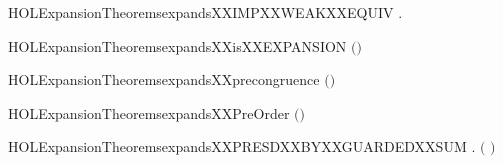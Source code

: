 \newcommand{\HOLExpansionTheoremsexpandsXXEPSYY}{\UseVerbatim{HOLExpansionTheoremsexpandsXXEPSYY}}
\begin{SaveVerbatim}{HOLExpansionTheoremsexpandsXXIMPXXWEAKXXEQUIV}
\HOLTokenTurnstile{} \HOLSymConst{\HOLTokenForall{}} .    \HOLSymConst{\HOLTokenImp{}}   
\end{SaveVerbatim}
\newcommand{\HOLExpansionTheoremsexpandsXXIMPXXWEAKXXEQUIV}{\UseVerbatim{HOLExpansionTheoremsexpandsXXIMPXXWEAKXXEQUIV}}
\begin{SaveVerbatim}{HOLExpansionTheoremsexpandsXXisXXEXPANSION}
\HOLTokenTurnstile{}  \ensuremath{(}\ensuremath{)}
\end{SaveVerbatim}
\newcommand{\HOLExpansionTheoremsexpandsXXisXXEXPANSION}{\UseVerbatim{HOLExpansionTheoremsexpandsXXisXXEXPANSION}}
\begin{SaveVerbatim}{HOLExpansionTheoremsexpandsXXprecongruence}
\HOLTokenTurnstile{}  \ensuremath{(}\ensuremath{)}
\end{SaveVerbatim}
\newcommand{\HOLExpansionTheoremsexpandsXXprecongruence}{\UseVerbatim{HOLExpansionTheoremsexpandsXXprecongruence}}
\begin{SaveVerbatim}{HOLExpansionTheoremsexpandsXXPreOrder}
\HOLTokenTurnstile{}  \ensuremath{(}\ensuremath{)}
\end{SaveVerbatim}
\newcommand{\HOLExpansionTheoremsexpandsXXPreOrder}{\UseVerbatim{HOLExpansionTheoremsexpandsXXPreOrder}}
\begin{SaveVerbatim}{HOLExpansionTheoremsexpandsXXPRESDXXBYXXGUARDEDXXSUM}
\HOLTokenTurnstile{} \HOLSymConst{\HOLTokenForall{}}     .
          \HOLSymConst{\HOLTokenConj{}}    \HOLSymConst{\HOLTokenImp{}}
       \HOLSymConst{\ensuremath{\ldotp}} \HOLSymConst{\ensuremath{+}} \HOLSymConst{\ensuremath{\ldotp}}  \ensuremath{(}\HOLSymConst{\ensuremath{\ldotp}} \HOLSymConst{\ensuremath{+}} \HOLSymConst{\ensuremath{\ldotp}}\ensuremath{)}
\end{SaveVerbatim}
